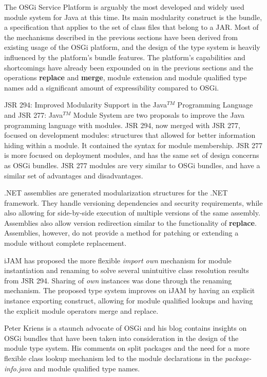 The OSGi Service Platform \cite{OSGi4} is arguably the most developed and
widely used module system for Java at this time. Its main modularity 
construct is the bundle, a specification that applies to the set of class
files that belong to a JAR. Most of the mechanisms
described in the previous sections have been derived from existing usage
of the OSGi platform, and the design of the type system is heavily
influenced by the platform's bundle features. The platform's
capabilities and shortcomings have already been expounded on in the 
previous sections and the operations \textbf{replace} and \textbf{merge},
module extension and module qualified type names add a significant amount of expressibility compared
to OSGi.

JSR 294: Improved Modularity Support in the Java$^{TM}$ Programming Language \cite{JSR294} and
JSR 277: Java$^{TM}$ Module System \cite{JSR277} are two proposals to improve
the Java programming language with modules. JSR 294, now merged with JSR 277, focused
on development modules: structures that allowed for better information hiding within 
a module. It contained the syntax for module membership.
JSR 277 is more focused on deployment modules, and has the same set of design 
concerns as OSGi bundles. JSR 277 modules are very similar to OSGi bundles,
and have a similar set of advantages and disadvantages.

.NET assemblies \cite{netassemblies} are generated modularization structures
for the .NET framework. They handle versioning dependencies and security
requirements, while also allowing for side-by-side execution of multiple
versions of the same assembly. Assemblies also allow version redirection
similar to the functionality of \textbf{replace}. Assemblies, however,
do not provide a method for patching or extending a module without 
complete replacement.

iJAM \cite{iJAM} has proposed the more flexible \textit{import own}
mechanism for module instantiation and renaming to solve several unintuitive class
resolution results from JSR 294. Sharing of \textit{own} instances was
done through the renaming mechanism. The proposed type system improves
on iJAM by having an explicit instance exporting construct,
allowing for module qualified lookups and having the explicit module operators
merge and replace.

Peter Kriens is a staunch advocate of OSGi and his blog \cite{iJAMComments, superpackagesNoMore}
contains insights on OSGi bundles that have been taken into consideration
in the design of the module type system. His comments on split packages and
the need for a more flexible class lookup mechanism led to the module declarations
in the \textit{package-info.java} and module qualified type names.

